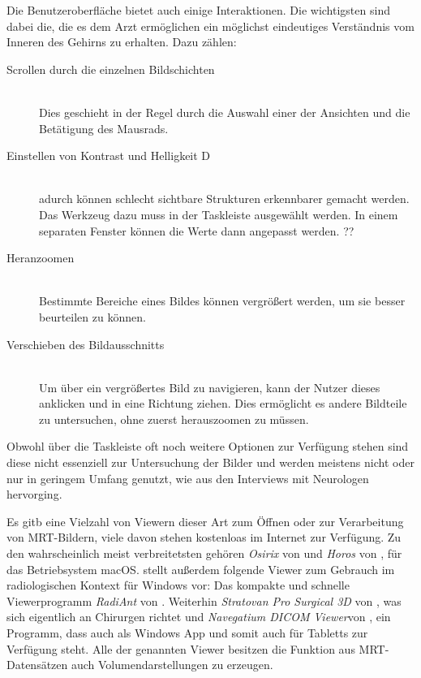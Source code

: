 Die Benutzeroberfläche bietet auch einige Interaktionen. Die wichtigsten sind dabei die, die es dem Arzt ermöglichen ein möglichst eindeutiges Verständnis vom Inneren des Gehirns zu erhalten.  Dazu zählen:

\begin{description}
\item [Scrollen durch die einzelnen Bildschichten]\hfill \\
Dies geschieht in der Regel durch die Auswahl einer der Ansichten und die Betätigung des Mausrads. 
\item [Einstellen von Kontrast und Helligkeit D]\hfill \\
adurch können schlecht sichtbare Strukturen erkennbarer gemacht werden. Das Werkzeug dazu muss in der Taskleiste ausgewählt werden. In einem separaten Fenster können die Werte dann angepasst werden. ??
\item [Heranzoomen]\hfill \\
Bestimmte Bereiche eines Bildes können vergrößert werden, um sie besser beurteilen zu können.
\item [Verschieben des Bildausschnitts]\hfill \\
Um über ein vergrößertes Bild zu navigieren, kann der Nutzer dieses anklicken und in eine Richtung ziehen. Dies ermöglicht es andere Bildteile zu untersuchen, ohne zuerst herauszoomen zu müssen.
\end{description}

Obwohl über die Taskleiste oft noch weitere Optionen zur Verfügung stehen sind diese nicht essenziell zur Untersuchung der Bilder und werden meistens nicht oder nur in geringem Umfang genutzt, wie aus den Interviews mit Neurologen hervorging.

Es gitb eine Vielzahl von Viewern dieser Art zum Öffnen oder zur Verarbeitung von MRT-Bildern, viele davon stehen kostenloas im Internet zur Verfügung. 
Zu den wahrscheinlich meist verbreitetsten gehören \textit{Osirix} von \citet{osirix} und \textit{Horos} von \citet{horos}, für das Betriebsystem macOS. \citet{radiocafe} stellt außerdem folgende Viewer zum Gebrauch im radiologischen Kontext für Windows vor: Das kompakte und schnelle Viewerprogramm \textit{RadiAnt} von \citet{radiant}. Weiterhin \textit{Stratovan Pro Surgical 3D} von \citet{prosurgical}, was sich eigentlich an Chirurgen richtet und \textit{Navegatium DICOM Viewer}von \citet{navegatium}, ein Programm, dass auch als Windows App und somit auch für Tabletts zur Verfügung steht.
Alle der genannten Viewer besitzen die Funktion aus MRT-Datensätzen auch Volumendarstellungen zu erzeugen.


